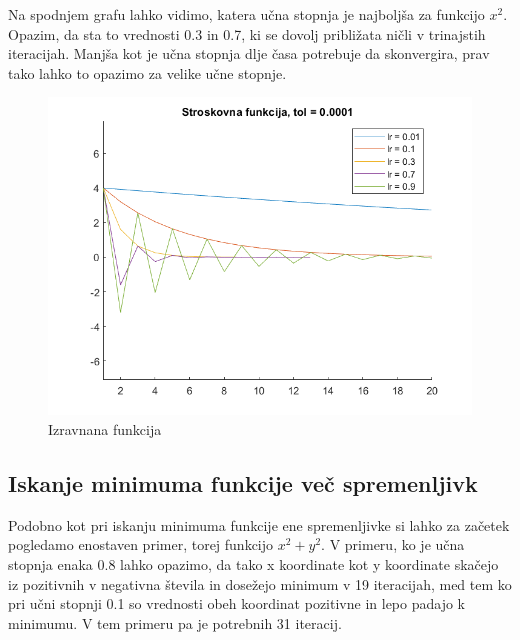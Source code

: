 \documentclass{article}
\begin{document}
\newpage
\noindent  Na spodnjem grafu lahko vidimo, katera učna stopnja je najboljša za funkcijo $x^2$. Opazim, da sta to vrednosti 0.3 in 0.7, ki se dovolj približata ničli v trinajstih iteracijah. Manjša kot je učna stopnja dlje časa potrebuje da skonvergira, prav tako lahko to opazimo za velike učne stopnje. \\


\begin{figure}[!htb]
\includegraphics[scale=0.6]{str_fun}   
 \caption{Izravnana funkcija}
\label{fig:foobar}
\end{figure}

\newpage
\subsection{Iskanje minimuma funkcije več spremenljivk}
Podobno kot pri iskanju minimuma funkcije ene spremenljivke si lahko za začetek pogledamo enostaven primer, torej funkcijo $x^2+y^2$. V primeru, ko je učna stopnja enaka 0.8 lahko opazimo, da tako x koordinate kot y koordinate skačejo iz pozitivnih v negativna števila in dosežejo minimum v 19 iteracijah, med tem ko pri učni stopnji 0.1 so vrednosti obeh koordinat pozitivne in lepo padajo k minimumu. V tem primeru pa je potrebnih 31 iteracij.\\
\end{document}

